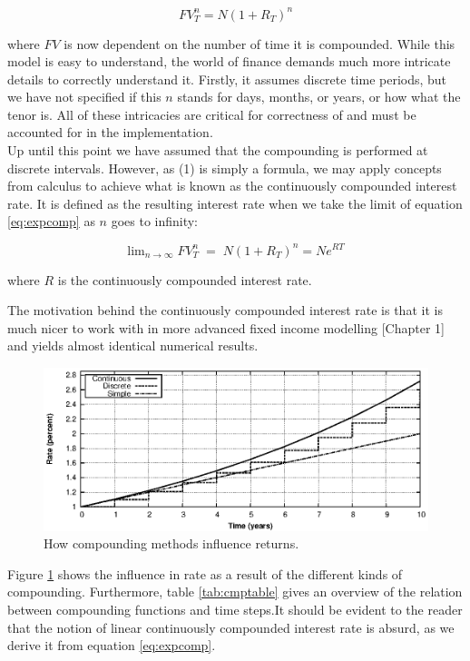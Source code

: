 \begin{equation}\label{eq:expcomp}
FV_T^n = N (1 + R_T)^n
\end{equation}

where $FV$ is now dependent on the number of time it is compounded.
While this model is easy to understand, the world of finance demands much more 
intricate details to correctly understand it. Firstly, it assumes 
discrete time periods, but we have not specified if this $n$ stands for days, 
months, or years, or how what the tenor is. All of these intricacies are critical
for correctness of \hql and must be accounted for in the implementation.\\

Up until this point we have assumed that the compounding is performed at 
discrete intervals. However, as (1) is simply a formula, we may apply concepts 
from calculus to achieve what is known as the continuously compounded interest 
rate. It is defined as the resulting interest rate when we take the limit of 
equation \ref{eq:expcomp} as $n$ goes to infinity:

\begin{equation}
\text{lim}_{n \rightarrow \infty}\; FV_T^n \; = \; N (1 + R_T)^n
= N e^{RT}
\end{equation}

where $R$ is the continuously compounded interest rate.

The motivation behind the continuously compounded interest rate is that it is
much nicer to work with in more advanced fixed income modelling
\cite{cmunk}[Chapter 1] and yields almost identical numerical results.\\

\begin{figure}[!htb]
\centering
\includegraphics[scale=1.2]{images/comp02.eps}
\caption{How compounding methods influence returns.}
\label{fig:comp02}
\end{figure}

Figure \ref{fig:comp02} shows the influence in rate as a result of the different
kinds of compounding. Furthermore, table \ref{tab:cmptable} gives an overview of
the relation between compounding functions and time steps.It should be evident to 
the reader that the notion of linear continuously compounded interest rate is 
absurd, as we derive it from equation \ref{eq:expcomp}.

